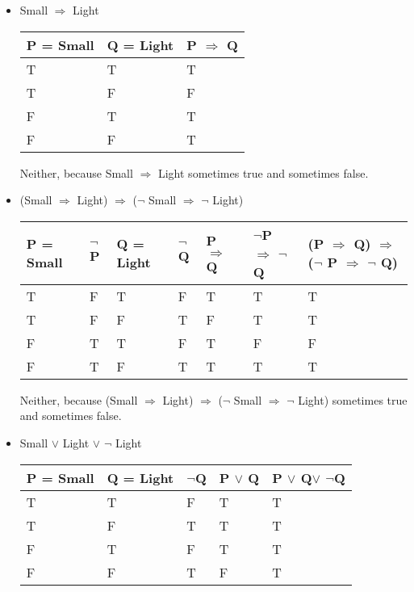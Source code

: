 \documentclass{article}
\begin{document}
\begin{itemize}
    \item Small $\Rightarrow$ Light
    \begin{center}
        \begin{tabular}{ |l|l|l|}
          \hline
          P = Small & Q = Light &P $\Rightarrow$ Q   \\ \hline
          T & T &T\\ \hline
          T & F &F\\ \hline
          F & T &T\\ \hline
          F & F &T\\
          \hline
        \end{tabular}
        \end{center}
        Neither, because Small $\Rightarrow$ Light sometimes true and sometimes false.
    \item (Small $\Rightarrow$ Light) $\Rightarrow$ ($\neg$  Small $\Rightarrow$ $\neg$ Light)
    \begin{center}
        \begin{tabular}{ |l|l|l|l|l|l|l|}
          \hline
          P = Small & $\neg$P &Q = Light &$\neg$Q &P $\Rightarrow$ Q &  $\neg$P $\Rightarrow$ $\neg$Q& (P $\Rightarrow$ Q) $\Rightarrow$ ($\neg$ P $\Rightarrow$ $\neg$ Q)  \\ \hline
          T & F & T & F & T & T &T \\ \hline
          T & F & F & T & F & T &T \\ \hline
          F & T & T & F & T & F &F \\ \hline
          F & T & F & T & T & T &T \\
          \hline
        \end{tabular}
        \end{center}
        Neither, because (Small $\Rightarrow$ Light) $\Rightarrow$ ($\neg$ Small $\Rightarrow$ $\neg$ Light) sometimes true and sometimes false.
    \item Small $\vee$ Light $\vee$ $\neg$ Light
    \begin{center}
        \begin{tabular}{ |l|l|l|l|l|}
          \hline
          P = Small &  Q = Light &$\neg$Q &P $\vee$ Q &  P $\vee$ Q$\vee$ $\neg$Q\\ \hline
          T & T & F & T & T\\ \hline
          T & F & T & T & T\\ \hline
          F & T & F & T & T\\ \hline
          F & F & T & F & T\\

\end{tabular}
\end{center}
\end{itemize}
\end{document}
